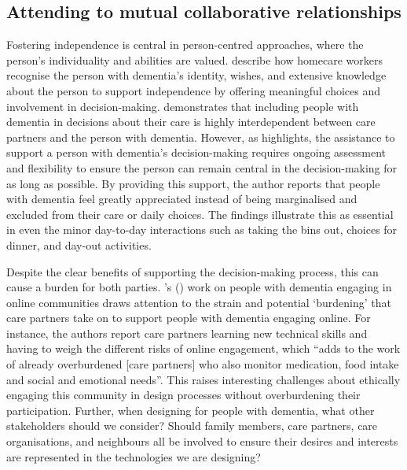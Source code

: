 \subsection{Attending to mutual collaborative relationships}
\label{BL:gap:relationships}
Fostering independence is central in person-centred approaches, where the person's individuality and abilities are valued. \cite{leverton2021supporting} describe how homecare workers recognise the person with dementia's identity, wishes, and extensive knowledge about the person to support independence by offering meaningful choices and involvement in decision-making. \cite{leverton2021supporting} demonstrates that including people with dementia in decisions about their care is highly interdependent between care partners and the person with dementia. However, as \cite{fetherstonhaugh2013being} highlights, the assistance to support a person with dementia's decision-making requires ongoing assessment and flexibility to ensure the person can remain central in the decision-making for as long as possible. By providing this support, the author reports that people with dementia feel greatly appreciated instead of being marginalised and excluded from their care or daily choices. The findings illustrate this as essential in even the minor day-to-day interactions such as taking the bins out, choices for dinner, and day-out activities. 

Despite the clear benefits of supporting the decision-making process, this can cause a burden for both parties. \citeauthor{piper2016technological}'s (\citeyear{piper2016technological}) work on people with dementia engaging in online communities draws attention to the strain and potential `burdening' that care partners take on to support people with dementia engaging online. For instance, the authors report care partners learning new technical skills and having to weigh the different risks of online engagement, which  ``adds to the work of already overburdened [care partners] who also monitor medication, food intake and social and emotional needs''. This raises interesting challenges about ethically engaging this community in design processes without overburdening their participation. Further, when designing for people with dementia, what other stakeholders should we consider? Should family members, care partners, care organisations, and neighbours all be involved to ensure their desires and interests are represented in the technologies we are designing?


